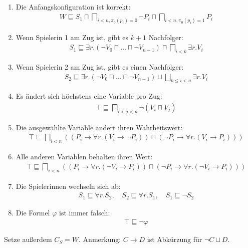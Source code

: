 \begin{enumerate}
    \item Die Anfangskonfiguration ist korrekt:
        \begin{align*}
            W \sqsubseteq S_1 \sqcap \bigsqcap_{i < n, \pi_0(p_i) = 0} \neg P_i \sqcap \bigsqcap_{i < n, \pi_0(p_i) = 1} P_i
        \end{align*}
    \item Wenn Spielerin 1 am Zug ist, gibt es $k + 1$ Nachfolger:
        \begin{align*}
            S_1 \sqsubseteq \exists r.(\neg V_0 \sqcap \dots \sqcap \neg V_{n - 1}) \sqcap \bigsqcap_{i < k} \exists r. V_i
        \end{align*}
    \item Wenn Spielerin 2 am Zug ist, gibt es einen Nachfolger:
        \begin{align*}
            S_2 \sqsubseteq \exists r.(\neg V_0 \sqcap \dots \sqcap \neg V_{n - 1}) \sqcup \bigsqcup_{k\leq i < n} \exists r.V_i
        \end{align*}
    \item Es ändert sich höchstens eine Variable pro Zug:
        \begin{align*}
            \top \sqsubseteq \bigsqcap_{i < j < n} \neg (V_i \sqcap V_j)
        \end{align*}
    \item Die ausgewählte Variable ändert ihren Wahrheitswert:
        \begin{align*}
            \top \sqsubseteq \bigsqcap_{i < n}
            \left( \left( P_i \rightarrow \forall r.(V_i \rightarrow \neg P_i)
                    \right) \sqcap \left(
                    \neg P_i \rightarrow \forall r.(V_i \rightarrow P_i)
            \right) \right)
        \end{align*}
    \item Alle anderen Variablen behalten ihren Wert:
        \begin{align*}
            \top \sqsubseteq \bigsqcap_{i < n}
            \left( \left( P_i \rightarrow \forall r.(\neg V_i \rightarrow P_i)
                    \right) \sqcap \left(
                    \neg P_i \rightarrow \forall r.(\neg V_i \rightarrow P_i)
            \right) \right)
        \end{align*}
    \item Die Spielerinnen wechseln sich ab:
        \begin{align*}
            S_1 \sqsubseteq \forall r.S_2, \quad S_2 \sqsubseteq \forall r.S_1, \quad S_1 \sqsubseteq \neg S_2
        \end{align*}
    \item Die Formel $\varphi$ ist immer falsch:
        \begin{align*}
            \top \sqsubseteq \neg \varphi
        \end{align*}
\end{enumerate}
Setze außerdem $C_S = W$. Anmerkung: $C \rightarrow D$ ist Abkürzung für $\neg C \sqcup D$.

